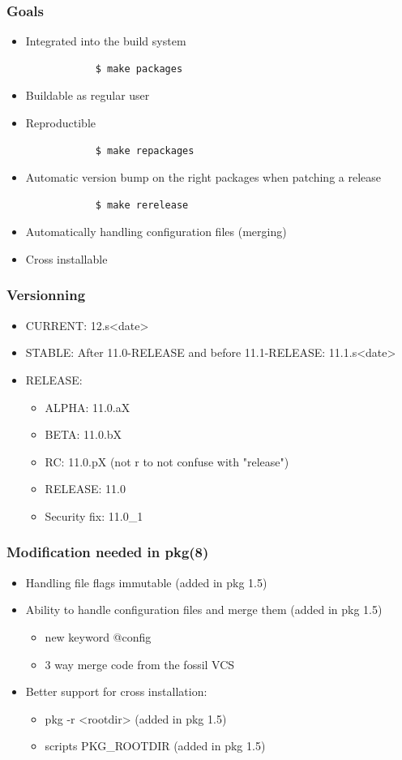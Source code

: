 \begin{frame}[fragile]
	\frametitle{Goals}
	\begin{itemize}
		\item Integrated into the build system
			\begin{lstlisting}
			$ make packages
			\end{lstlisting}
		\item Buildable as regular user
		\item Reproductible
			\begin{lstlisting}
			$ make repackages
			\end{lstlisting}
		\item Automatic version bump on the right packages when patching
			a release
			\begin{lstlisting}
			$ make rerelease
			\end{lstlisting}
		\item Automatically handling configuration files (merging)
		\item Cross installable
	\end{itemize}
\end{frame}

\begin{frame}
	\frametitle{Versionning}
	\begin{itemize}
		\item CURRENT: 12.s<date>
		\item STABLE: After 11.0-RELEASE and before 11.1-RELEASE: 11.1.s<date>
		\item RELEASE:
			\begin{itemize}
				\item ALPHA: 11.0.aX
				\item BETA: 11.0.bX
				\item RC: 11.0.pX (not r to not confuse with "release")
				\item RELEASE: 11.0
				\item Security fix: 11.0\_1
			\end{itemize}
	\end{itemize}
\end{frame}

\begin{frame}
	\frametitle{Modification needed in pkg(8)}
	\begin{itemize}
		\item Handling file flags immutable (added in pkg 1.5)
		\item Ability to handle configuration files and merge them (added in pkg 1.5)
			\begin{itemize}
				\item new keyword @config
				\item 3 way merge code from the fossil VCS
			\end{itemize}
		\item Better support for cross installation:
			\begin{itemize}
				\item pkg -r <rootdir> (added in pkg 1.5)
				\item scripts PKG\_ROOTDIR (added in pkg 1.5)
			\end{itemize}
	\end{itemize}
\end{frame}

